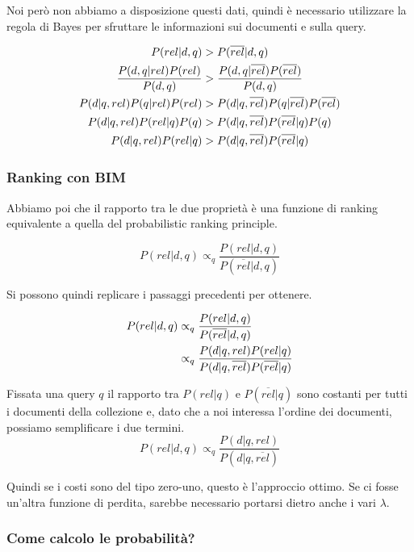 Noi però non abbiamo a disposizione questi dati, quindi è necessario utilizzare la regola di Bayes per sfruttare le informazioni sui documenti e sulla query.

\begin{align*}
	P(rel | d,q) &> P(\overline{rel} | d,q) \\
	\frac{P(d,q|rel)P(rel)}{P(d,q)} &> \frac{P(d,q|\overline{rel})P(\overline{rel})}{P(d,q)} \\
	P(d|q,rel)P(q|rel)P(rel) &> P(d|q,\overline{rel})P(q|\overline{rel})P(\overline{rel}) \\
	P(d|q,rel)P(rel|q) P(q) &> P(d|q,\overline{rel})P(\overline{rel}|q) P(q) \\
	P(d|q,rel)P(rel|q) &> P(d|q,\overline{rel})P(\overline{rel}|q) \\
\end{align*}

\subsubsection{Ranking con BIM}

Abbiamo poi che il rapporto tra le due proprietà è una funzione di ranking equivalente a quella del probabilistic ranking principle.

$$
P(rel | d, q) \propto_q \frac{P(rel | d,q)}{P(\overline{rel} | d,q)}
$$

Si possono quindi replicare i passaggi precedenti per ottenere.

\begin{align*}
P(rel | d, q) &\propto_q \frac{P(rel | d,q)}{P(\overline{rel} | d,q)} \\
              &\propto_q \frac{ P(d|q,rel)P(rel|q) }{P(d|q,\overline{rel})P(\overline{rel}|q)}
\end{align*}


\noindent Fissata una query $q$ il rapporto tra $P(rel|q)$ e $P(\overline{rel}|q)$ sono costanti per tutti i documenti della collezione e, dato che a noi interessa l'ordine dei documenti, possiamo semplificare i due termini.\\

$$
\boxed{P(rel | d,q) \propto_q \frac{P(d|q,rel)}{P(d|q,\overline{rel})}}
$$

\noindent Quindi se i costi sono del tipo zero-uno, questo è l'approccio ottimo. Se ci fosse un'altra funzione di perdita, sarebbe necessario portarsi dietro anche i vari $\lambda$.


\subsubsection{Come calcolo le probabilità?}

